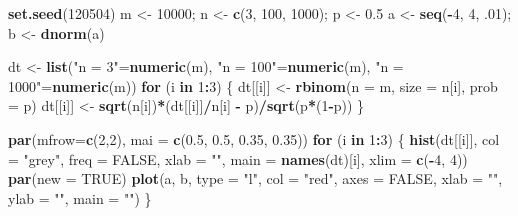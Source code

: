 \documentclass[
  12pt,
]{article}
\newenvironment{Shaded}{\begin{snugshade}}{\end{snugshade}}
\newcommand{\ControlFlowTok}[1]{\textcolor[rgb]{0.13,0.29,0.53}{\textbf{#1}}}
\newcommand{\DataTypeTok}[1]{\textcolor[rgb]{0.13,0.29,0.53}{#1}}
\newcommand{\DecValTok}[1]{\textcolor[rgb]{0.00,0.00,0.81}{#1}}
\newcommand{\FloatTok}[1]{\textcolor[rgb]{0.00,0.00,0.81}{#1}}
\newcommand{\KeywordTok}[1]{\textcolor[rgb]{0.13,0.29,0.53}{\textbf{#1}}}
\newcommand{\NormalTok}[1]{#1}
\newcommand{\OperatorTok}[1]{\textcolor[rgb]{0.81,0.36,0.00}{\textbf{#1}}}
\newcommand{\OtherTok}[1]{\textcolor[rgb]{0.56,0.35,0.01}{#1}}
\newcommand{\StringTok}[1]{\textcolor[rgb]{0.31,0.60,0.02}{#1}}
\begin{document}
\begin{Shaded}
\begin{Highlighting}[]
\KeywordTok{set.seed}\NormalTok{(}\DecValTok{120504}\NormalTok{)}
\NormalTok{m \textless{}{-}}\StringTok{ }\DecValTok{10000}\NormalTok{; n \textless{}{-}}\StringTok{ }\KeywordTok{c}\NormalTok{(}\DecValTok{3}\NormalTok{, }\DecValTok{100}\NormalTok{, }\DecValTok{1000}\NormalTok{); p \textless{}{-}}\StringTok{ }\FloatTok{0.5}
\NormalTok{a \textless{}{-}}\StringTok{ }\KeywordTok{seq}\NormalTok{(}\OperatorTok{{-}}\DecValTok{4}\NormalTok{, }\DecValTok{4}\NormalTok{, }\FloatTok{.01}\NormalTok{); b \textless{}{-}}\StringTok{ }\KeywordTok{dnorm}\NormalTok{(a)}

\NormalTok{dt \textless{}{-}}\StringTok{ }\KeywordTok{list}\NormalTok{(}\StringTok{"n = 3"}\NormalTok{=}\KeywordTok{numeric}\NormalTok{(m), }\StringTok{"n = 100"}\NormalTok{=}\KeywordTok{numeric}\NormalTok{(m), }\StringTok{"n = 1000"}\NormalTok{=}\KeywordTok{numeric}\NormalTok{(m))}
\ControlFlowTok{for}\NormalTok{ (i }\ControlFlowTok{in} \DecValTok{1}\OperatorTok{:}\DecValTok{3}\NormalTok{) \{}
\NormalTok{  dt[[i]] \textless{}{-}}\StringTok{ }\KeywordTok{rbinom}\NormalTok{(}\DataTypeTok{n =}\NormalTok{ m, }\DataTypeTok{size =}\NormalTok{ n[i], }\DataTypeTok{prob =}\NormalTok{ p)}
\NormalTok{  dt[[i]] \textless{}{-}}\StringTok{ }\KeywordTok{sqrt}\NormalTok{(n[i])}\OperatorTok{*}\NormalTok{(dt[[i]]}\OperatorTok{/}\NormalTok{n[i] }\OperatorTok{{-}}\StringTok{ }\NormalTok{p)}\OperatorTok{/}\KeywordTok{sqrt}\NormalTok{(p}\OperatorTok{*}\NormalTok{(}\DecValTok{1}\OperatorTok{{-}}\NormalTok{p))}
\NormalTok{\}}

\KeywordTok{par}\NormalTok{(}\DataTypeTok{mfrow=}\KeywordTok{c}\NormalTok{(}\DecValTok{2}\NormalTok{,}\DecValTok{2}\NormalTok{), }\DataTypeTok{mai =} \KeywordTok{c}\NormalTok{(}\FloatTok{0.5}\NormalTok{, }\FloatTok{0.5}\NormalTok{, }\FloatTok{0.35}\NormalTok{, }\FloatTok{0.35}\NormalTok{)) }
\ControlFlowTok{for}\NormalTok{ (i }\ControlFlowTok{in} \DecValTok{1}\OperatorTok{:}\DecValTok{3}\NormalTok{) \{}
  \KeywordTok{hist}\NormalTok{(dt[[i]], }\DataTypeTok{col =} \StringTok{"grey"}\NormalTok{, }\DataTypeTok{freq =} \OtherTok{FALSE}\NormalTok{, }
    \DataTypeTok{xlab =} \StringTok{""}\NormalTok{, }\DataTypeTok{main =} \KeywordTok{names}\NormalTok{(dt)[i], }\DataTypeTok{xlim =} \KeywordTok{c}\NormalTok{(}\OperatorTok{{-}}\DecValTok{4}\NormalTok{, }\DecValTok{4}\NormalTok{))}
  \KeywordTok{par}\NormalTok{(}\DataTypeTok{new =} \OtherTok{TRUE}\NormalTok{)}
  \KeywordTok{plot}\NormalTok{(a, b, }\DataTypeTok{type =} \StringTok{"l"}\NormalTok{, }\DataTypeTok{col =} \StringTok{"red"}\NormalTok{, }\DataTypeTok{axes =} \OtherTok{FALSE}\NormalTok{, }
    \DataTypeTok{xlab =} \StringTok{""}\NormalTok{, }\DataTypeTok{ylab =} \StringTok{""}\NormalTok{, }\DataTypeTok{main =} \StringTok{""}\NormalTok{)}
\NormalTok{\}}
\end{Highlighting}
\end{Shaded}
\end{document}
